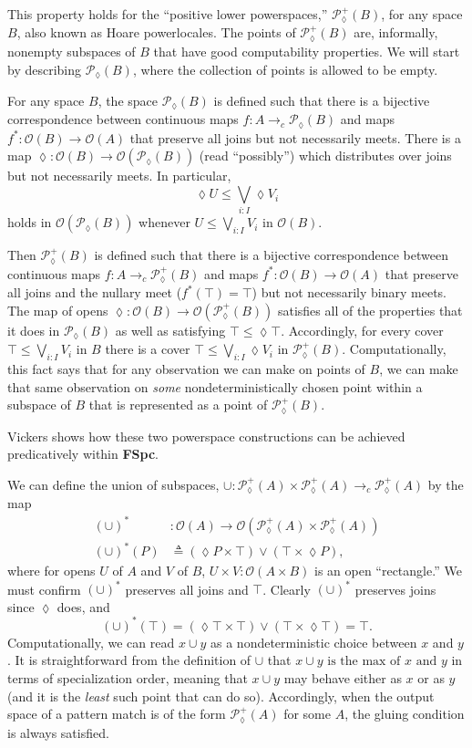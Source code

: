 \documentclass[conference]{IEEEtran}
\newcommand{\PLower}{\mathcal{P}_\lozenge}
\newcommand{\cto}{\to_c}
\newcommand{\Open}[1]{\mathcal{O}({#1})}
\newcommand{\isthemaxof}[3]{{#1}\text{ is the max of }{#2}\text{ and }{#3}}
\newcommand{\iimg}[1]{{#1}^*}
\begin{document}
This property holds for the ``positive lower powerspaces,'' $\PLower^+(B)$, for any space $B$, also known as Hoare powerlocales. The points of $\PLower^+(B)$ are, informally, nonempty subspaces of $B$ that have good computability properties. We will start by describing $\PLower(B)$, where the collection of points is allowed to be empty.

For any space $B$, the space $\PLower(B)$ is defined such that there is a bijective correspondence between continuous maps $f : A \cto \PLower(B)$ and maps $\iimg{f} : \Open{B} \to \Open{A}$ that preserve all joins but not necessarily meets. There is a map $\lozenge : \Open{B} \to \Open{\PLower(B)}$ (read ``possibly'') which distributes over joins but not necessarily meets. In particular,
\[
\lozenge U \le \bigvee_{i : I} \lozenge V_i
\]
holds in $\Open{\PLower(B)}$ whenever $U \le \bigvee_{i : I} V_i$ in $\Open{B}$. 

Then $\PLower^+(B)$ is defined such that there is a bijective correspondence between continuous maps $f : A \cto \PLower^+(B)$ and maps $\iimg{f} : \Open{B} \to \Open{A}$ that preserve all joins and the nullary meet ($\iimg{f}(\top) = \top$) but not necessarily binary meets. The map of opens $\lozenge : \Open{B} \to \Open{\PLower^+(B)}$ satisfies all of the properties that it does in $\PLower(B)$ as well as satisfying
$\top \le \lozenge \top$. Accordingly, for every cover $\top \le \bigvee_{i : I} V_i$ in $B$ there is a cover $\top \le \bigvee_{i : I} \lozenge V_i$ in $\PLower^+(B)$. Computationally, this fact says that for any observation we can make on points of $B$, we can make that same observation on \emph{some} nondeterministically chosen point within a subspace of $B$ that is represented as a point of $\PLower^+(B)$.

Vickers \cite{vickersdoublepowerlocale} shows how these two powerspace constructions can be achieved predicatively within \textbf{FSpc}. 

We can define the union of subspaces, $
\cup : \PLower^+(A) \times \PLower^+(A) \cto \PLower^+(A)$ by the map
\begin{align*}
\iimg{(\cup)} &: \Open{A} \to \Open{\PLower^+(A) \times \PLower^+(A)}
\\ \iimg{(\cup)}(P) &\triangleq (\lozenge P \times \top) \vee (\top \times \lozenge P),
\end{align*}
where for opens $U$ of $A$ and $V$ of $B$, $U \times V : \Open{A \times B}$ is an open ``rectangle.''
We must confirm $\iimg{(\cup)}$ preserves all joins and $\top$. Clearly $\iimg{(\cup)}$ preserves joins since $\lozenge$ does, and
\[
\iimg{(\cup)}(\top) = (\lozenge \top \times \top) \vee (\top \times \lozenge \top) = \top.
\]
Computationally, we can read $x \cup y$ as a nondeterministic choice between $x$ and $y$.
It is straightforward from the definition of $\cup$ that $\isthemaxof{x \cup y}{x}{y}$ in terms of specialization order, meaning that $x \cup y$ may behave either as $x$ or as $y$ (and it is the \emph{least} such point that can do so). Accordingly, when the output space of a pattern match is of the form $\PLower^+(A)$ for some $A$, the gluing condition is always satisfied.
\end{document}

